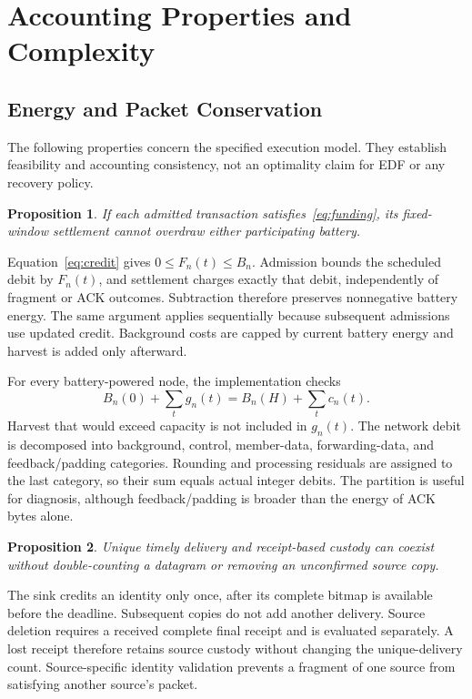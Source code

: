 \documentclass[journal,10pt]{IEEEtran}
\newtheorem{proposition}{Proposition}
\begin{document}
\section{Accounting Properties and Complexity}
\subsection{Energy and Packet Conservation}
The following properties concern the specified execution model. They establish feasibility and accounting consistency, not an optimality claim for EDF or any recovery policy.

\begin{proposition}
If each admitted transaction satisfies~\eqref{eq:funding}, its fixed-window settlement cannot overdraw either participating battery.
\end{proposition}
\begin{IEEEproof}
Equation~\eqref{eq:credit} gives $0\leq F_n(t)\leq B_n$. Admission bounds the scheduled debit by $F_n(t)$, and settlement charges exactly that debit, independently of fragment or ACK outcomes. Subtraction therefore preserves nonnegative battery energy. The same argument applies sequentially because subsequent admissions use updated credit. Background costs are capped by current battery energy and harvest is added only afterward.
\end{IEEEproof}

For every battery-powered node, the implementation checks
\begin{equation}
B_n(0)+\sum_t g_n(t)=B_n(H)+\sum_t c_n(t).
\label{eq:energyledger}
\end{equation}
Harvest that would exceed capacity is not included in $g_n(t)$. The network debit is decomposed into background, control, member-data, forwarding-data, and feedback/padding categories. Rounding and processing residuals are assigned to the last category, so their sum equals actual integer debits. The partition is useful for diagnosis, although feedback/padding is broader than the energy of ACK bytes alone.

\begin{proposition}
Unique timely delivery and receipt-based custody can coexist without double-counting a datagram or removing an unconfirmed source copy.
\end{proposition}
\begin{IEEEproof}
The sink credits an identity only once, after its complete bitmap is available before the deadline. Subsequent copies do not add another delivery. Source deletion requires a received complete final receipt and is evaluated separately. A lost receipt therefore retains source custody without changing the unique-delivery count. Source-specific identity validation prevents a fragment of one source from satisfying another source's packet.
\end{IEEEproof}
\end{document}
